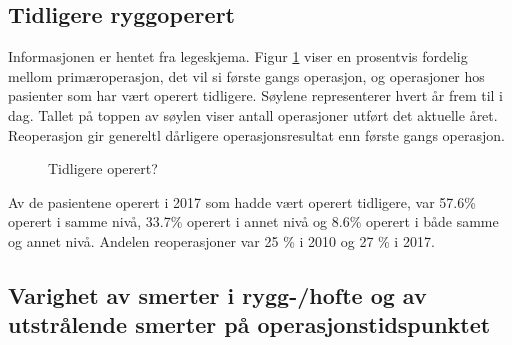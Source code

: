 \documentclass [norsk,a4paper,twoside]{article}\usepackage[]{graphicx}\usepackage[]{color}
\begin{document}
\clearpage

\subsection{Tidligere ryggoperert}
Informasjonen er hentet fra legeskjema.
Figur \ref{fig:TidlOp} viser en prosentvis fordelig mellom primæroperasjon, det vil si første gangs 
operasjon, og operasjoner hos pasienter som har vært operert tidligere.  
Søylene representerer hvert år frem til i dag. Tallet på toppen av søylen viser antall operasjoner utført 
det aktuelle året. Reoperasjon gir genereltl dårligere operasjonsresultat enn første gangs operasjon.



\begin{figure}[ht]
\caption{\label{fig:TidlOp} Tidligere operert? }
\end{figure}



Av de pasientene operert i 2017 som hadde vært operert tidligere, var 57.6\% 
operert i samme nivå, 33.7\% 
operert i annet nivå og 8.6\% 
operert i både samme og annet nivå.
Andelen reoperasjoner var 25 \% i 2010 og 27 \% i 2017.



\subsection{Varighet av smerter i rygg-/hofte og av utstrålende smerter på operasjonstidspunktet}
\end{document}
